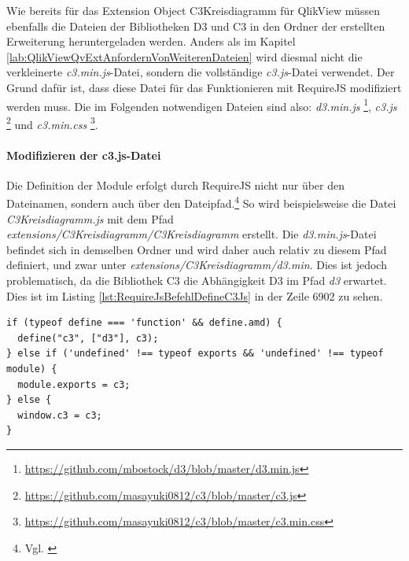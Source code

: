 Wie bereits für das Extension Object C3Kreisdiagramm für QlikView müssen ebenfalls die Dateien der Bibliotheken D3 und C3 in den Ordner der erstellten Erweiterung heruntergeladen werden. Anders als im Kapitel \ref{lab:QlikViewQvExtAnfordernVonWeiterenDateien} wird diesmal nicht die verkleinerte \textit{c3.min.js}-Datei, sondern die vollständige \textit{c3.js}-Datei verwendet. Der Grund dafür ist, dass diese Datei für das Funktionieren mit RequireJS modifiziert werden muss.
Die im Folgenden notwendigen Dateien sind also: \textit{d3.min.js} \footnote{\url{https://github.com/mbostock/d3/blob/master/d3.min.js}}, \textit{c3.js} \footnote{\url{https://github.com/masayuki0812/c3/blob/master/c3.js}} und \textit{c3.min.css} \footnote{\url{https://github.com/masayuki0812/c3/blob/master/c3.min.css}}.

\paragraph{Modifizieren der c3.js-Datei }

Die Definition der Module erfolgt durch RequireJS nicht nur über den Dateinamen, sondern auch über den Dateipfad.\footnote{Vgl. \cite{RequireJSAPILoadJavaScriptFiles}} So wird beispielsweise die Datei \textit{C3Kreisdiagramm.js} mit dem Pfad \textit{extensions/C3Kreisdiagramm/C3Kreisdiagramm} erstellt. Die \textit{d3.min.js}-Datei befindet sich in demselben Ordner und wird daher auch relativ zu diesem Pfad definiert, und zwar unter \textit{extensions/C3Kreisdiagramm/d3.min}. Dies ist jedoch problematisch, da die Bibliothek C3 die Abhängig\-keit D3 im Pfad \textit{d3} erwartet. Dies ist im Listing \ref{lst:RequireJsBefehlDefineC3Js} in der Zeile 6902 zu sehen.

\begin{listing}[htbp]
\begin{verbatim}
if (typeof define === 'function' && define.amd) {
  define("c3", ["d3"], c3);
} else if ('undefined' !== typeof exports && 'undefined' !== typeof module) {
  module.exports = c3;
} else {
  window.c3 = c3;
}
\end{verbatim}
\caption[RequireJS-Befehl \textit{define} in der C3.js-Bibliothek]{RequireJS-Befehl \textit{define} in der C3.js-Bibliothek der Version 0.4.9, c3.js, \\Quelle: \cite{c3masayuki0812c3}}
\label{lst:RequireJsBefehlDefineC3Js}
\end{listing}

